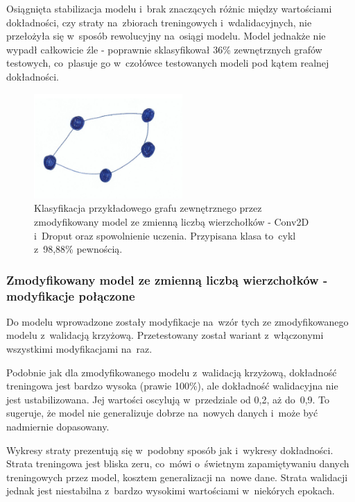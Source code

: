 Osiągnięta stabilizacja modelu i~brak znaczących różnic między wartościami dokładności,
czy straty na~zbiorach treningowych i~wdalidacyjnych, nie przełożyła się w~sposób rewolucyjny na~osiągi modelu.
Model jednakże nie wypadł całkowicie źle - poprawnie sklasyfikował 36\% zewnętrznych grafów testowych,
co~plasuje go w~czołówce testowanych modeli pod kątem realnej dokładności.

\begin{figure}[ht]
	\centering
	\includegraphics[height=4cm]{../graph_classification/test_graphs/drawn/cycle-7.png}
	\caption{Klasyfikacja przykładowego grafu zewnętrznego przez zmodyfikowany model ze zmienną liczbą wierzchołków
		- Conv2D i~Droput oraz spowolnienie uczenia.
		Przypisana klasa to~cykl z~98,88\% pewnością.}
	\label{Fig:tests-var-1d}
\end{figure}
\FloatBarrier

\subsubsection{Zmodyfikowany model ze zmienną liczbą wierzchołków - modyfikacje połączone}

Do modelu wprowadzone zostały modyfikacje na~wzór tych ze zmodyfikowanego modelu z~walidacją krzyżową.
Przetestowany został wariant z~włączonymi wszystkimi modyfikacjami na~raz.

Podobnie jak dla zmodyfikowanego modelu z~walidacją krzyżową, dokładność treningowa jest bardzo wysoka (prawie 100\%),
ale dokładność walidacyjna nie jest ustabilizowana. Jej wartości oscylują w~przedziale od 0,2, aż do~0,9.
To sugeruje, że model nie generalizuje dobrze na~nowych danych i~może być nadmiernie dopasowany.

Wykresy straty prezentują się w~podobny sposób jak i~wykresy dokładności.
Strata treningowa jest bliska zeru, co~mówi o~świetnym zapamiętywaniu danych treningowych przez model, kosztem generalizacji na~nowe dane.
Strata walidacji jednak jest niestabilna z~bardzo wysokimi wartościami w~niekórych epokach.

